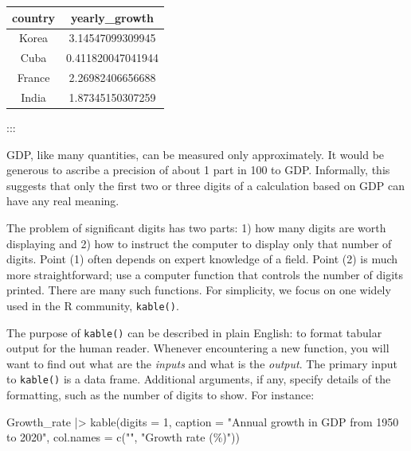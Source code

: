 \documentclass[
  letterpaper,
  DIV=11,
  numbers=noendperiod,
  oneside]{scrartcl}
\newenvironment{Shaded}{\begin{snugshade}}{\end{snugshade}}
\newcommand{\AttributeTok}[1]{\textcolor[rgb]{0.40,0.45,0.13}{#1}}
\newcommand{\DecValTok}[1]{\textcolor[rgb]{0.68,0.00,0.00}{#1}}
\newcommand{\FunctionTok}[1]{\textcolor[rgb]{0.28,0.35,0.67}{#1}}
\newcommand{\NormalTok}[1]{\textcolor[rgb]{0.00,0.23,0.31}{#1}}
\newcommand{\SpecialCharTok}[1]{\textcolor[rgb]{0.37,0.37,0.37}{#1}}
\newcommand{\StringTok}[1]{\textcolor[rgb]{0.13,0.47,0.30}{#1}}
\begin{document}
\begin{longtable}[]{@{}cc@{}}
\toprule\noalign{}
country & yearly\_growth \\
\midrule\noalign{}
\endhead
\bottomrule\noalign{}
\endlastfoot
Korea & 3.14547099309945 \\
Cuba & 0.411820047041944 \\
France & 2.26982406656688 \\
India & 1.87345150307259 \\
\end{longtable}

:::

GDP, like many quantities, can be measured only approximately. It would
be generous to ascribe a precision of about 1 part in 100 to GDP.
Informally, this suggests that only the first two or three digits of a
calculation based on GDP can have any real meaning.

The problem of significant digits has two parts: 1) how many digits are
worth displaying {} and 2) how
to instruct the computer to display only that number of digits. Point
(1) often depends on expert knowledge of a field. Point (2) is much more
straightforward; use a computer function that controls the number of
digits printed. There are many such functions. For simplicity, we focus
on one widely used in the R community, \texttt{kable()}.

The purpose of \texttt{kable()} can be described in plain English: to
format tabular output for the human reader. Whenever encountering a new
function, you will want to find out what are the \emph{inputs} and what
is the \emph{output}. The primary input to \texttt{kable()} is a data
frame. Additional arguments, if any, specify details of the formatting,
such as the number of digits to show. For instance:

\begin{Shaded}
\begin{Highlighting}[]
\NormalTok{Growth\_rate }\SpecialCharTok{|\textgreater{}} 
  \FunctionTok{kable}\NormalTok{(}\AttributeTok{digits =} \DecValTok{1}\NormalTok{, }
        \AttributeTok{caption =} \StringTok{"Annual growth in GDP from 1950 to 2020"}\NormalTok{,}
        \AttributeTok{col.names =} \FunctionTok{c}\NormalTok{(}\StringTok{""}\NormalTok{, }\StringTok{"Growth rate (\%)"}\NormalTok{))}
\end{Highlighting}
\end{Shaded}
\end{document}
